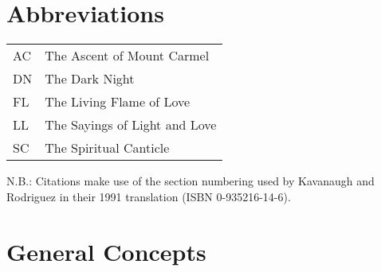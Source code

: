 \section*{Abbreviations}
\begin{tabular}{ l l }
  AC & The Ascent of Mount Carmel \\
  DN & The Dark Night \\
  FL & The Living Flame of Love \\
  LL & The Sayings of Light and Love \\
  SC & The Spiritual Canticle \\
\end{tabular}\bigskip

\noindent N.B.: Citations make use of the section numbering used by Kavanaugh and Rodriguez in their 1991 translation (ISBN 0-935216-14-6).

\section*{General Concepts}

